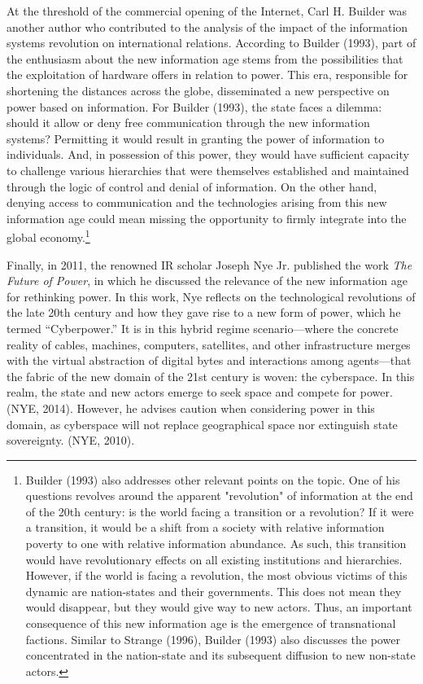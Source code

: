 At the threshold of the commercial opening of the Internet, Carl H. Builder was another author who contributed to the analysis of the impact of the information systems revolution on international relations. According to Builder (1993), part of the enthusiasm about the new information age stems from the possibilities that the exploitation of hardware offers in relation to power. This era, responsible for shortening the distances across the globe, disseminated a new perspective on power based on information. 
For Builder (1993), the state faces a dilemma: should it allow or deny free communication through the new information systems? Permitting it would result in granting the power of information to individuals. And, in possession of this power, they would have sufficient capacity to challenge various hierarchies that were themselves established and maintained through the logic of control and denial of information. On the other hand, denying access to communication and the technologies arising from this new information age could mean missing the opportunity to firmly integrate into the global economy.\footnote{Builder (1993) also addresses other relevant points on the topic. One of his questions revolves around the apparent "revolution" of information at the end of the 20th century: is the world facing a transition or a revolution? If it were a transition, it would be a shift from a society with relative information poverty to one with relative information abundance. As such, this transition would have revolutionary effects on all existing institutions and hierarchies. However, if the world is facing a revolution, the most obvious victims of this dynamic are nation-states and their governments. This does not mean they would disappear, but they would give way to new actors. Thus, an important consequence of this new information age is the emergence of transnational factions. Similar to Strange (1996), Builder (1993) also discusses the power concentrated in the nation-state and its subsequent diffusion to new non-state actors.}

Finally, in 2011, the renowned IR scholar Joseph Nye Jr. published the work \textit{The Future of Power}, in which he discussed the relevance of the new information age for rethinking power. In this work, Nye reflects on the technological revolutions of the late 20th century and how they gave rise to a new form of power, which he termed “Cyberpower.” It is in this hybrid regime scenario—where the concrete reality of cables, machines, computers, satellites, and other infrastructure merges with the virtual abstraction of digital bytes and interactions among agents—that the fabric of the new domain of the 21st century is woven: the cyberspace. In this realm, the state and new actors emerge to seek space and compete for power. (NYE, 2014). However, he advises caution when considering power in this domain, as cyberspace will not replace geographical space nor extinguish state sovereignty. (NYE, 2010).

